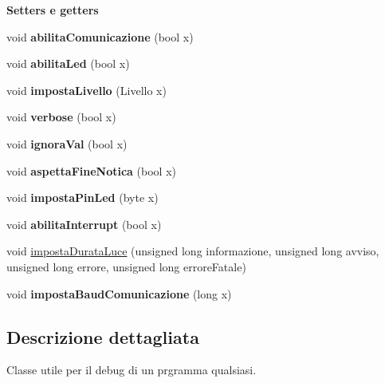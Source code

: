 \begin{Indent}\textbf{ Setters e getters}\par
\begin{DoxyCompactItemize}
\item 
\mbox{\label{class_debug_ab03d23dad7fa932bf0c6838db3a5d142}} 
void {\bfseries abilita\+Comunicazione} (bool x)
\item 
\mbox{\label{class_debug_a4ca82923658785f76171043e4eb2ee24}} 
void {\bfseries abilita\+Led} (bool x)
\item 
\mbox{\label{class_debug_a58aaf4c3326841a1c2a6563333a85617}} 
void {\bfseries imposta\+Livello} (Livello x)
\item 
\mbox{\label{class_debug_aea58af021d6edbdd4ff19109918134d4}} 
void {\bfseries verbose} (bool x)
\item 
\mbox{\label{class_debug_a64ac40ab9c93c5a8e7f63eaa81adbd10}} 
void {\bfseries ignora\+Val} (bool x)
\item 
\mbox{\label{class_debug_a624336a83c55db45970fe262e87db17c}} 
void {\bfseries aspetta\+Fine\+Notica} (bool x)
\item 
\mbox{\label{class_debug_a11596537d7367a7a131123924757289f}} 
void {\bfseries imposta\+Pin\+Led} (byte x)
\item 
\mbox{\label{class_debug_a8576f5bbb5564aa80a7befb3307b1ee9}} 
void {\bfseries abilita\+Interrupt} (bool x)
\item 
void \hyperlink{class_debug_a65bc65d905d75d0ca765d81132f563c1}{imposta\+Durata\+Luce} (unsigned long informazione, unsigned long avviso, unsigned long errore, unsigned long errore\+Fatale)
\item 
\mbox{\label{class_debug_a210722127dfc4e5c3b545625f2dd0d6e}} 
void {\bfseries imposta\+Baud\+Comunicazione} (long x)
\end{DoxyCompactItemize}
\end{Indent}


\subsection{Descrizione dettagliata}
Classe utile per il debug di un prgramma qualsiasi. 

